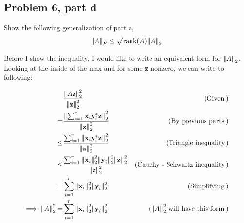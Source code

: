 \newpage
\subsection{Problem 6, part d}
Show the following generalization of part a,
\[
\norm{A}_F \leq \sqrt{\text{rank}(A)}\norm{A}_2
\]
\partbreak
\begin{solution}
    Before I show the inequality, I would like to write an equivalent form for $\norm{A}_2$. Looking at the inside of the max and for some \textbf{z} nonzero, we can write to following:

    \alignbreak
    \begin{align}
    &\frac{\norm{A\textbf{z}}_2^2}{\norm{\textbf{z}}_2^2} &\text{(Given.)}\nonumber\\
    =& \frac{\norm{\sum_{i = 1}^r\textbf{x}_i\textbf{y}_i^*\textbf{z}}_2^2}{\norm{\textbf{z}}_2^2} &\text{(By previous parts.)}\nonumber\\
    \leq& \frac{\sum_{i = 1}^r\norm{\textbf{x}_i\textbf{y}_i^*\textbf{z}}_2^2}{\norm{\textbf{z}}_2^2} &\text{(Triangle inequality.)}\nonumber\\
    \leq& \frac{\sum_{i = 1}^r\norm{\textbf{x}_i}_2^2\norm{\textbf{y}_i}_2^2\norm{\textbf{z}}_2^2}{\norm{\textbf{z}}_2^2} &\text{(Cauchy - Schwartz inequality.)}\nonumber\\
    =&\sum_{i = 1}^r\norm{\textbf{x}_i}_2^2\norm{\textbf{y}_i}_2^2 &\text{(Simplifying.)}\nonumber\\
    \implies \norm{A}_2^2 =& \sum_{i = 1}^r\norm{\textbf{x}_i}_2^2\norm{\textbf{y}_i}_2^2 &\text{($\norm{A}_2^2$ will have this form.)} \label{p6d: norm A2 form}
    \end{align}
    \alignbreak


\end{solution}

